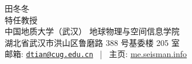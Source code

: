 \documentclass[11pt, a4paper]{article}
\makeatletter
\newcommand{\MyName}{田冬冬}
\newcommand{\MyRole}{特任教授}
\newcommand{\Email}{dtian@cug.edu.cn}
\newcommand{\Website}{me.seisman.info}
\newcommand{\Affiliation}{中国地质大学（武汉）\hspace{1ex} 地球物理与空间信息学院}
\newcommand{\Address}{湖北省武汉市洪山区鲁磨路 388 号基委楼 205 室}
\newcommand{\makefield}[2]{\makebox[1.5em]{\color{MarkerColour!80!black}#1} #2}
\makeatother
\begin{document}
\thispagestyle{empty}

\begin{center}
    \kaishu
    {\fontsize{28pt}{0}\selectfont \MyName}
    \\[0.5cm]
    {\fontsize{17pt}{0}\selectfont \MyRole}
    \\[0.3cm]
    {\fontsize{13pt}{0}\selectfont
        \Affiliation
        \\[0.2cm]
        \Address
        \\[0.08cm]
        邮箱: \href{mailto:\Email}{\texttt{\Email}}
        \, | \,
        主页: \href{https://\Website}{\Website}
    }
\end{center}












\end{document}

